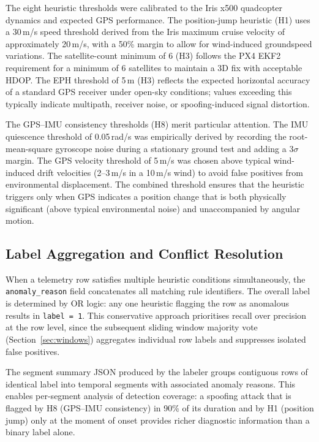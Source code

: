 The eight heuristic thresholds were calibrated to the Iris x500 quadcopter dynamics and expected GPS performance. The position-jump heuristic (H1) uses a 30\,m/s speed threshold derived from the Iris maximum cruise velocity of approximately 20\,m/s, with a 50\% margin to allow for wind-induced groundspeed variations. The satellite-count minimum of 6 (H3) follows the PX4 EKF2 requirement for a minimum of 6 satellites to maintain a 3D fix with acceptable HDOP. The EPH threshold of 5\,m (H3) reflects the expected horizontal accuracy of a standard GPS receiver under open-sky conditions; values exceeding this typically indicate multipath, receiver noise, or spoofing-induced signal distortion.

The GPS--IMU consistency thresholds (H8) merit particular attention. The IMU quiescence threshold of 0.05\,rad/s was empirically derived by recording the root-mean-square gyroscope noise during a stationary ground test and adding a 3$\sigma$ margin. The GPS velocity threshold of 5\,m/s was chosen above typical wind-induced drift velocities (2--3\,m/s in a 10\,m/s wind) to avoid false positives from environmental displacement. The combined threshold ensures that the heuristic triggers only when GPS indicates a position change that is both physically significant (above typical environmental noise) and unaccompanied by angular motion.

\subsection{Label Aggregation and Conflict Resolution}

When a telemetry row satisfies multiple heuristic conditions simultaneously, the \texttt{anomaly\_reason} field concatenates all matching rule identifiers. The overall label is determined by OR logic: any one heuristic flagging the row as anomalous results in \texttt{label = 1}. This conservative approach prioritises recall over precision at the row level, since the subsequent sliding window majority vote (Section~\ref{sec:windows}) aggregates individual row labels and suppresses isolated false positives.

The segment summary JSON produced by the labeler groups contiguous rows of identical label into temporal segments with associated anomaly reasons. This enables per-segment analysis of detection coverage: a spoofing attack that is flagged by H8 (GPS--IMU consistency) in 90\% of its duration and by H1 (position jump) only at the moment of onset provides richer diagnostic information than a binary label alone.

